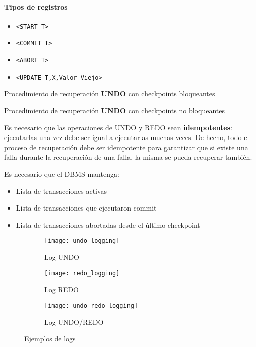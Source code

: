 \documentclass[a4paper, twoside]{article}
\newcommand{\codedir}{../resources/code} %
\begin{document}
\paragraph{Tipos de registros}
\begin{itemize}
	\item \texttt{<START T>}
	\item \texttt{<COMMIT T>}
	\item \texttt{<ABORT T>}
	\item \texttt{<UPDATE T,X,Valor\_Viejo>}
\end{itemize}

\begin{algorithm}[H]
	
	\caption{Procedimiento de recuperación \textbf{UNDO} con checkpoints bloqueantes}
\end{algorithm}

\begin{algorithm}[H]
	
	\caption{Procedimiento de recuperación \textbf{UNDO} con checkpoints no bloqueantes}
\end{algorithm}
		
Es necesario que las operaciones de UNDO y REDO sean \textbf{idempotentes}: ejecutarlas una vez debe ser igual a ejecutarlas muchas veces. De hecho, todo el proceso de recuperación debe ser idempotente para garantizar que si existe una falla durante la recuperación de una falla, la misma se pueda recuperar también.

Es necesario que el DBMS mantenga:
\begin{itemize}
	\item Lista de transacciones activas
	\item Lista de transacciones que ejecutaron commit
	\item Lista de transacciones abortadas desde el último checkpoint
\end{itemize}

\begin{figure}[H]
	\centering
	\begin{subfigure}{0.48\textwidth}
		\texttt{[image: undo\_logging]}
		\caption{Log UNDO}
	\end{subfigure}
	\begin{subfigure}{0.48\textwidth}
		\texttt{[image: redo\_logging]}
		\caption{Log REDO}
	\end{subfigure}
	\begin{subfigure}{0.48\textwidth}
		\texttt{[image: undo\_redo\_logging]}
		\caption{Log UNDO/REDO}
	\end{subfigure}
	\caption{Ejemplos de logs}
\end{figure}
\end{document}
